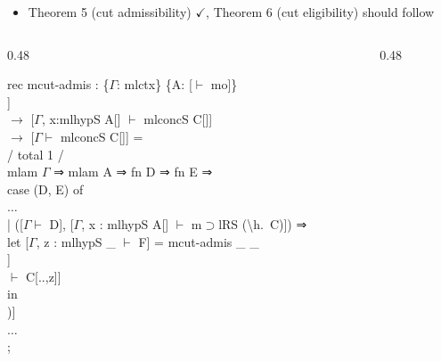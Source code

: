 \documentclass[9ps]{beamer}
\begin{document}
\begin{frame}{}
    \begin{itemize}
        \item Theorem 5 (cut admissibility) $\checkmark$, Theorem 6 (cut eligibility) should follow
    \end{itemize}

    \begin{columns}
        \begin{column}{0.48\linewidth}
  
           
\scriptsize
\ttfamily



rec mcut-admis : \{$\Gamma$: mlctx\} \{A: [$\vdash$ mo]\}\\
\quad [$\Gamma \vdash$ mlconcS A[]]\\
\quad $\to$ [$\Gamma$, x:mlhypS A[] $\vdash$ mlconcS C[]]\\
\quad $\to$ [$\Gamma \vdash$ mlconcS C[]] =\\[4pt]

/ total 1 /\\[4pt]

mlam $\Gamma$ ⇒ mlam A ⇒ fn D ⇒ fn E ⇒\\
case (D, E) of\\[4pt]

\quad $\dots$\\[4pt]

\quad | ([$\Gamma \vdash$ D], [$\Gamma$, x : mlhypS A[] $\vdash$ m$\supset$lRS (\textbackslash h.\ C)]) ⇒\\[4pt]

\quad\quad let [$\Gamma$, z : mlhypS \_ $\vdash$ F] = mcut-admis \_ \_\\
\quad\quad\quad [$\Gamma$, z : mlhypS \_ $\vdash$ D[..]]\\
\quad\quad\quad [$\Gamma$, z : mlhypS \_, x : mlhypS A[] $\vdash$ C[..,z]]\\
\quad\quad in\\[4pt]

\quad\quad [$\Gamma \vdash$ m$\supset$lRS (\textbackslash h.\ F[..,h])]\\[4pt]

\quad $\dots$\\

;
        \end{column}

        \begin{column}{0.48\linewidth}
            

\end{column}
\end{columns}
\end{frame}
\end{document}
